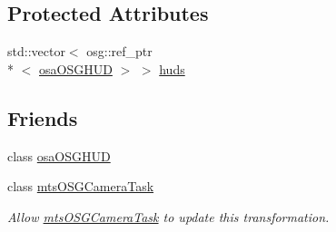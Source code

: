 \subsection*{Protected Attributes}
\begin{DoxyCompactItemize}
\item 
std\-::vector$<$ osg\-::ref\-\_\-ptr\\*
$<$ \hyperlink{classosa_o_s_g_h_u_d}{osa\-O\-S\-G\-H\-U\-D} $>$ $>$ \hyperlink{classosa_o_s_g_camera_a237022117dad9914d09ca392c455448b}{huds}
\end{DoxyCompactItemize}
\subsection*{Friends}
\begin{DoxyCompactItemize}
\item 
class \hyperlink{classosa_o_s_g_camera_a558e1c2494d52ebb0ac01ac496c5e888}{osa\-O\-S\-G\-H\-U\-D}
\item 
class \hyperlink{classosa_o_s_g_camera_a7f45bb9ad9fefaf19bb707da99c35df7}{mts\-O\-S\-G\-Camera\-Task}
\begin{DoxyCompactList}\small\item\em Allow \hyperlink{classmts_o_s_g_camera_task}{mts\-O\-S\-G\-Camera\-Task} to update this transformation. \end{DoxyCompactList}\end{DoxyCompactItemize}


